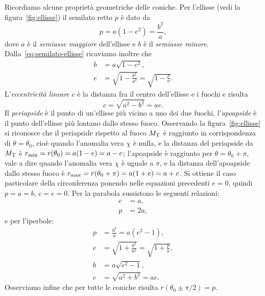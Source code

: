Ricordiamo alcune proprietà geometriche delle coniche. Per l'ellisse (vedi la
figura~\ref{fig:ellisse}) il semilato retto $p$ è dato da
\begin{equation}
  \label{eq:semilato-ellisse}
  p = a(1-e^2) = \frac{b^2}{a},
\end{equation}
dove $a$ è il \emph{semiasse maggiore} dell'ellisse e $b$ è il \emph{semiasse
  minore}. Dalla~\eqref{eq:semilato-ellisse} ricaviamo inoltre che
\begin{align}
  b &= a\sqrt{1-e^2}, \label{eq:semiasse-minore-ellisse}\\
  e &= \sqrt{1-\frac{b^2}{a^2}} =
  \sqrt{1-\frac{p}{a}}. \label{eq:eccentricita-ellisse}
\end{align}
L'\emph{eccentricità lineare} $c$ è la distanza fra il centro dell'ellisse e i
fuochi e risulta
\begin{equation}
  c=\sqrt{a^2-b^2} = ae.
\end{equation}
Il \emph{periapside} è il punto di un'ellisse più vicino a uno dei due fuochi,
l'\emph{apoapside} è il punto dell'ellisse più lontano dallo stesso
fuoco. Osservando la figura~\ref{fig:ellisse} si riconosce che il periapside
rispetto al fuoco $M_\textup{T}$ è raggiunto in corrispondenza di
$\theta=\theta_0$, cioè quando l'anomalia vera $\chi$ è nulla, e la distanza del
periapside da $M_\textup{T}$ è $r_\textup{min} = r(\theta_0) = a(1-e) = a-c$;
l'apoapside è raggiunto per $\theta=\theta_0+\pi$, vale a dire quando l'anomalia
vera $\chi$ è uguale a $\pi$, e la distanza dell'apoapside dallo stesso fuoco è
$r_\textup{max} = r(\theta_0+\pi) = a(1+e)= a+c$. Si ottiene il caso particolare
della circonferenza ponendo nelle equazioni precedenti $e=0$, quindi $p=a=b$,
$c=e=0$. Per la parabola sussistono le seguenti relazioni:
\begin{align}
  c &= a,\\
  p &= 2a,
\end{align}
e per l'iperbole:
\begin{align}
  p &= \frac{b^2}{a} = a(e^2-1), \label{eq:semilato-iperbole}\\
  e &= \sqrt{1+\frac{b^2}{a^2}} =
  \sqrt{1+\frac{p}{a}}, \label{eq:eccentricita-iperbole}\\
  b &= a\sqrt{e^2-1}, \\
  c &= \sqrt{a^2+b^2} = ae.
\end{align}
Osserviamo infine che per tutte le coniche risulta $r(\theta_0\pm\pi/2)=p$.

